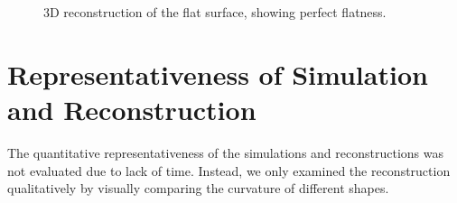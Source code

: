 \documentclass[../main.tex]{subfiles}
\begin{document}
\begin{figure}[H]
\begin{minipage}{0.49\textwidth}
        \caption{3D reconstruction of the flat surface, showing perfect flatness.}
        \label{fig:Flatsurface_recon}
    \end{minipage}
\end{figure}
\vspace{-15pt}

\section{Representativeness of Simulation and Reconstruction}
\vspace{-15pt}
The quantitative representativeness of the simulations and reconstructions was not evaluated due to lack of time. Instead, we only examined the reconstruction qualitatively by visually comparing the curvature of different shapes. %
\end{document}
